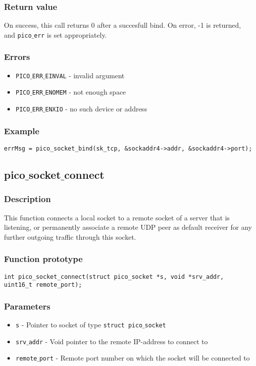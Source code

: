 \subsubsection*{Return value}
On success, this call returns 0 after a succesfull bind.
On error, -1 is returned, and \texttt{pico$\_$err} is set appropriately.

\subsubsection*{Errors}
\begin{itemize}[noitemsep]
\item \texttt{PICO$\_$ERR$\_$EINVAL} - invalid argument
\item \texttt{PICO$\_$ERR$\_$ENOMEM} - not enough space
\item \texttt{PICO$\_$ERR$\_$ENXIO} - no such device or address
\end{itemize}

\subsubsection*{Example}
\begin{verbatim}
errMsg = pico_socket_bind(sk_tcp, &sockaddr4->addr, &sockaddr4->port);
\end{verbatim}


\subsection{pico$\_$socket$\_$connect}

\subsubsection*{Description}
This function connects a local socket to a remote socket of a server that is listening, or permanently associate a remote UDP peer as default receiver for any further outgoing traffic through this socket.

\subsubsection*{Function prototype}
\begin{verbatim}
int pico_socket_connect(struct pico_socket *s, void *srv_addr,
uint16_t remote_port);
\end{verbatim}


\subsubsection*{Parameters}
\begin{itemize}[noitemsep]
\item \texttt{s} - Pointer to socket of type \texttt{struct pico$\_$socket}
\item \texttt{srv$\_$addr} - Void pointer to the remote IP-address to connect to
\item \texttt{remote$\_$port} - Remote port number on which the socket will be connected to
\end{itemize} 


